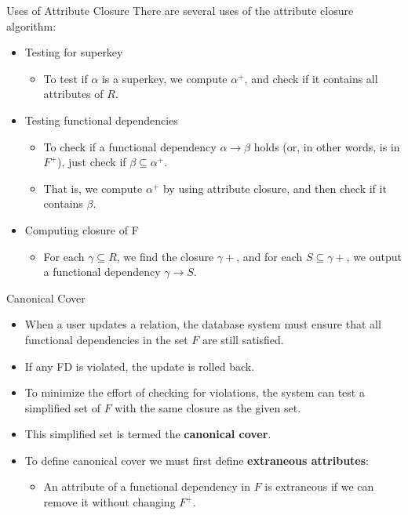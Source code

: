 \documentclass{beamer}
\begin{document}
\begin{frame}{Uses of Attribute Closure}
    There are several uses of the attribute closure algorithm:
    \begin{itemize}
        \item Testing for superkey
            \begin{itemize}
                \item To test if $\alpha$ is a superkey, we compute $\alpha^+$, and check if it contains all attributes of $R$.
            \end{itemize}
        \item Testing functional dependencies
            \begin{itemize}
                \item To check if a functional dependency $\alpha \rightarrow \beta$ holds (or, in other words, is in $F^+$), just check if $\beta \subseteq \alpha^+$.
                \item That is, we compute $\alpha^+$ by using attribute closure, and then check if it contains $\beta$.
            \end{itemize}
        \item Computing closure of F
            \begin{itemize}
                \item For each $\gamma \subseteq R$, we find the closure $\gamma+$, and for each $S \subseteq \gamma+$, we output a functional dependency $\gamma \rightarrow S$.
            \end{itemize}
    \end{itemize}
\end{frame}

\begin{frame}{Canonical Cover}
    \begin{itemize}
        \item When a user updates a relation, the database system must ensure that all functional dependencies in the set $F$ are still satisfied.
        \item If any FD is violated, the update is rolled back.
        \item To minimize the effort of checking for violations, the system can test a simplified set of $F$ with the same closure as the given set.
        \item This simplified set is termed the \textbf{canonical cover}.
        \item To define canonical cover we must first define \textbf{extraneous attributes}:
            \begin{itemize}
                \item An attribute of a functional dependency in $F$ is extraneous if we can remove it without changing $F^+$.
            \end{itemize}
    \end{itemize}
\end{frame}
\end{document}
